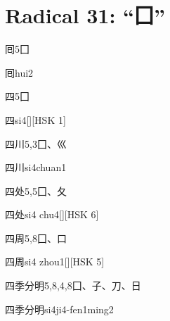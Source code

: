
\section*{Radical 31: ``⼞''}

\begin{Entry}{囘}{5}{⼞}
  \begin{Phonetics}{囘}{hui2}
  \end{Phonetics}
\end{Entry}

\begin{Entry}{四}{5}{⼞}
  \begin{Phonetics}{四}{si4}[][HSK 1]
  \end{Phonetics}
\end{Entry}

\begin{Entry}{四川}{5,3}{⼞、⼮}
  \begin{Phonetics}{四川}{si4chuan1}
  \end{Phonetics}
\end{Entry}

\begin{Entry}{四处}{5,5}{⼞、⼡}
  \begin{Phonetics}{四处}{si4 chu4}[][HSK 6]
  \end{Phonetics}
\end{Entry}

\begin{Entry}{四周}{5,8}{⼞、⼝}
  \begin{Phonetics}{四周}{si4 zhou1}[][HSK 5]
  \end{Phonetics}
\end{Entry}

\begin{Entry}{四季分明}{5,8,4,8}{⼞、⼦、⼑、⽇}
  \begin{Phonetics}{四季分明}{si4ji4-fen1ming2}
  \end{Phonetics}
\end{Entry}

